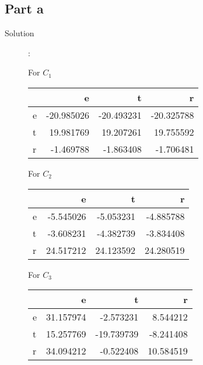 \documentclass[a4paper,11pt]{article}
\begin{document}
\subsection{Part a}
\begin{description}
  \item [Solution]: 

For $C_1$ \\
\begin{center}
\begin{tabular}{l|r|r|r}
	& e & t & r \\ \hline      
  e &   -20.985026& -20.493231& -20.325788 \\
  t &    19.981769&  19.207261&  19.755592 \\ 
  r &    -1.469788&  -1.863408&  -1.706481 \\
\end{tabular}  
   \end{center}   
 For $C_2$  \\    
   \begin{center}
\begin{tabular}{l|r|r|r}
	& e & t & r \\ \hline      
   e &   -5.545026&  -5.053231&  -4.885788 \\
   t &   -3.608231&  -4.382739&  -3.834408 \\ 
   r &   24.517212&  24.123592&  24.280519 \\
      \end{tabular}
   \end{center}
 For $C_3$  \\
\begin{center}
\begin{tabular}{l|r|r|r}
	& e & t & r \\ \hline      
  e &    31.157974&  -2.573231&   8.544212 \\
  t &    15.257769& -19.739739&  -8.241408 \\
  r &    34.094212&  -0.522408&  10.584519
      \end{tabular}
   \end{center}
\end{description}
\end{document}
